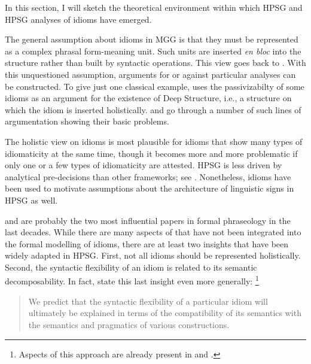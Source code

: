 \documentclass[output=paper
	        ,collection
	        ,collectionchapter
 	        ,biblatex
                ,babelshorthands
                ,newtxmath
                ,draftmode
                ,colorlinks, citecolor=brown
]{langscibook}
\begin{document}
In this section, I will sketch the theoretical environment within which HPSG and HPSG analyses of idioms have emerged.

The general assumption about idioms in MGG is that they
must be represented as a complex phrasal form-meaning unit. 
Such units are inserted \emph{en bloc} into the structure rather than built by syntactic operations.
This view goes back to \cite[]{Chomsky:65}. 
With this unquestioned assumption, arguments for or against particular analyses can be constructed. 
To give just one classical example, \citet{Chomsky81a} uses the passivizabilty of some idioms as an argument for the existence of Deep Structure, i.e., a structure on which the idiom is inserted holistically. 
%
\citet{Ruwet:91} and \citet{NSW94a} go through a number of such lines of argumentation showing their basic problems. 

The holistic view on idioms is most plausible for idioms that show many types of idiomaticity at the same time, though it becomes more and more problematic if only one or a few types of idiomaticity are attested.
HPSG is less driven by analytical pre-decisions than other frameworks; see . Nonetheless, idioms have been used to motivate assumptions about the architecture of linguistic signs in HPSG as well.

\citet{WSN84a-u} and \citet{NSW94a} are probably the two most influential papers in formal phraseology in the last decades. 
While there are many aspects of \citet{NSW94a} that have not been integrated into the formal modelling of idioms, 
there are at least two insights that have been widely adapted in HPSG.
First, not all idioms should be represented holistically. 
Second, the syntactic flexibility of an idiom is related to its semantic decomposability. 
In fact, \citet{NSW94a} state this last insight even more generally:%
\footnote{Aspects of this approach are already present in \citet{Higgins:74} and \citet{Newmeyer:74}.}

\begin{quote}
We predict that the syntactic flexibility of a particular idiom will ultimately be explained in terms of the compatibility of its semantics with the semantics and pragmatics of various constructions.
\citep[]{NSW94a}\label{NSW-quote}
\end{quote}
\end{document}
